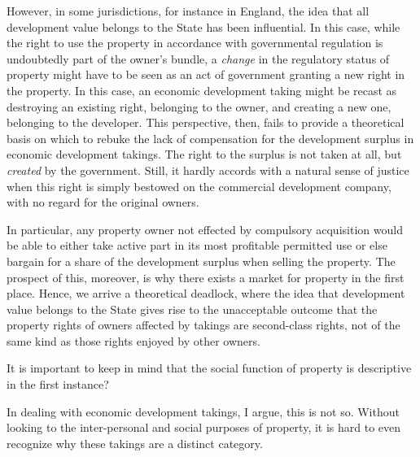 However, in some jurisdictions, for instance in England, the idea that all development value belongs to the State has been influential. In this case, while the right to use the property in accordance with governmental regulation is undoubtedly part of the owner's bundle, a {\it change} in the regulatory status of property might have to be seen as an act of government granting a new right in the property. In this case, an economic development taking might be recast as destroying an existing right, belonging to the owner, and creating a new one, belonging to the developer. This perspective, then, fails to provide a theoretical basis on which to rebuke the lack of compensation for the development surplus in economic development takings. The right to the surplus is not taken at all, but {\it created} by the government. Still, it hardly accords with a natural sense of justice when this right is simply bestowed on the commercial development company, with no regard for the original owners. 

In particular, any property owner not effected by compulsory acquisition would be able to either take active part in its most profitable permitted use or else bargain for a share of the development surplus when selling the property. The prospect of this, moreover, is why there exists a market for property in the first place. Hence, we arrive a theoretical deadlock, where the idea that development value belongs to the State gives rise to the unacceptable outcome that the property rights of owners affected by takings are second-class rights, not of the same kind as those rights enjoyed by other owners.

It is important to keep in mind that the social function of property is descriptive in the first instance?

In dealing with economic development takings, I argue, this is not so. Without looking to the inter-personal and social purposes of property, it is hard to even recognize why these takings are a distinct category.

